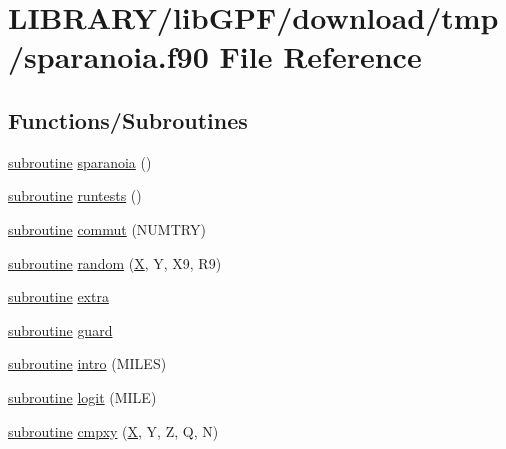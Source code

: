 \hypertarget{sparanoia_8f90}{}\section{L\+I\+B\+R\+A\+R\+Y/lib\+G\+P\+F/download/tmp/sparanoia.f90 File Reference}
\label{sparanoia_8f90}
\subsection*{Functions/\+Subroutines}
\begin{DoxyCompactItemize}
\item 
\hyperlink{M__stopwatch_83_8txt_acfbcff50169d691ff02d4a123ed70482}{subroutine} \hyperlink{sparanoia_8f90_a3924a135a277ffc4f0b2271ccde40373}{sparanoia} ()
\item 
\hyperlink{M__stopwatch_83_8txt_acfbcff50169d691ff02d4a123ed70482}{subroutine} \hyperlink{sparanoia_8f90_aff4ac3ebb7f899cf5e1730cd89c06ad1}{runtests} ()
\item 
\hyperlink{M__stopwatch_83_8txt_acfbcff50169d691ff02d4a123ed70482}{subroutine} \hyperlink{sparanoia_8f90_a2e6392c39ecf007b0ce79ffe66fbb3ea}{commut} (N\+U\+M\+T\+RY)
\item 
\hyperlink{M__stopwatch_83_8txt_acfbcff50169d691ff02d4a123ed70482}{subroutine} \hyperlink{sparanoia_8f90_ae429b4770ec5b607af3fbc27e8e02ccc}{random} (\hyperlink{intro__blas1_83_8txt_ac8596739bc875e90fe6e2ecf98e87906}{X}, Y, X9, R9)
\item 
\hyperlink{M__stopwatch_83_8txt_acfbcff50169d691ff02d4a123ed70482}{subroutine} \hyperlink{sparanoia_8f90_a420c65f09dabcda4b79dd31b732a3289}{extra}
\item 
\hyperlink{M__stopwatch_83_8txt_acfbcff50169d691ff02d4a123ed70482}{subroutine} \hyperlink{sparanoia_8f90_a870fdab923b08ed2d23d8f8da26c75ad}{guard}
\item 
\hyperlink{M__stopwatch_83_8txt_acfbcff50169d691ff02d4a123ed70482}{subroutine} \hyperlink{sparanoia_8f90_a08fb2993ab64ff8eadc9bbcdee178dfa}{intro} (M\+I\+L\+ES)
\item 
\hyperlink{M__stopwatch_83_8txt_acfbcff50169d691ff02d4a123ed70482}{subroutine} \hyperlink{sparanoia_8f90_ae605cf6771f748638a7ec12933f8ad86}{logit} (M\+I\+LE)
\item 
\hyperlink{M__stopwatch_83_8txt_acfbcff50169d691ff02d4a123ed70482}{subroutine} \hyperlink{sparanoia_8f90_ac62e9d33cdc70d76df2ff4dac081540e}{cmpxy} (\hyperlink{intro__blas1_83_8txt_ac8596739bc875e90fe6e2ecf98e87906}{X}, Y, Z, Q, N)

\end{DoxyCompactItemize}
